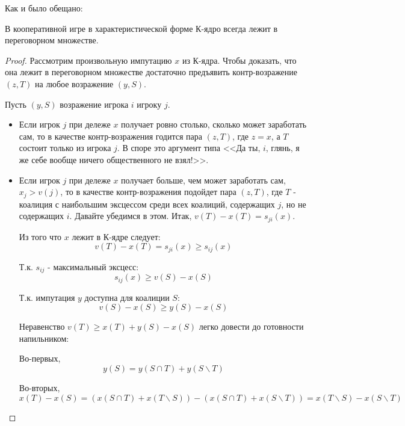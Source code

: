 Как и было обещано:

\begin{myth}
В кооперативной игре в характеристической форме К-ядро всегда лежит в переговорном множестве.
\end{myth}
\begin{proof}
Рассмотрим произвольную импутацию $x$ из К-ядра. Чтобы доказать, что она лежит в переговорном множестве достаточно предъявить контр-возражение $(z,T)$ на любое возражение $(y,S)$.

Пусть $(y,S)$ возражение игрока $i$ игроку $j$.
\begin{itemize}
\item Если игрок $j$ при дележе $x$ получает ровно столько, сколько может заработать сам, то в качестве контр-возражения годится пара $(z,T)$, где $z=x$, а $T$ состоит только из игрока $j$. В споре это аргумент типа <<Да ты, $i$, глянь, я же себе вообще ничего общественного не взял!>>.
\item Если игрок $j$ при дележе $x$ получает больше, чем может заработать сам, $x_{j}>v(j)$, то в качестве контр-возражения подойдет пара $(z,T)$, где $T$ - коалиция с наибольшим эксцессом среди всех коалиций, содержащих $j$, но не содержащих $i$. Давайте убедимся в этом. Итак, $v(T)-x(T)=s_{ji}(x)$. 

Из того что $x$ лежит в К-ядре следует:
\begin{equation}
v(T)-x(T)=s_{ji}(x) \geq s_{ij}(x)
\end{equation}

Т.к. $s_{ij}$ - максимальный эксцесс:
\begin{equation}
s_{ij}(x) \geq v(S)-x(S)
\end{equation}

Т.к. импутация $y$ доступна для коалиции $S$:
\begin{equation}
v(S)-x(S)\geq y(S)-x(S)
\end{equation}

Неравенство $v(T)\geq x(T)+y(S)-x(S)$ легко довести до готовности напильником:

Во-первых, 
\begin{equation}
y(S)=y(S\cap T)+y(S\backslash T)
\end{equation}

Во-вторых,
\begin{equation}
x(T)-x(S)=(x(S\cap T)+x(T\backslash S))-(x(S\cap T)+x(S\backslash T))=x(T\backslash S)-x(S\backslash T)
\end{equation}


\end{itemize}
\end{proof}
